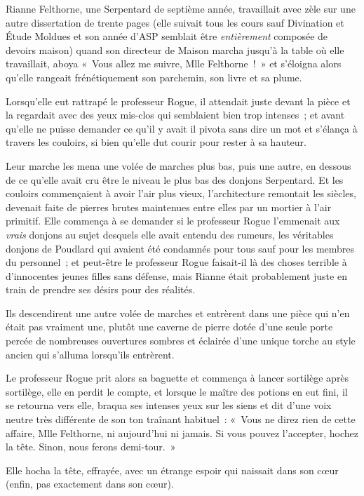 \later

Rianne Felthorne, une Serpentard de septième année, travaillait avec zèle sur une autre dissertation de trente pages (elle suivait tous les cours sauf Divination et Étude Moldues et son année d'ASP semblait être \emph{entièrement} composée de devoirs maison) quand son directeur de Maison marcha jusqu'à la table où elle travaillait, aboya «~Vous allez me suivre, Mlle Felthorne~!~» et s'éloigna alors qu'elle rangeait frénétiquement son parchemin, son livre et sa plume.

Lorsqu'elle eut rattrapé le professeur Rogue, il attendait juste devant la pièce et la regardait avec des yeux mis-clos qui semblaient bien trop intenses~; et avant qu'elle ne puisse demander ce qu'il y avait il pivota sans dire un mot et s'élança à travers les couloirs, si bien qu'elle dut courir pour rester à sa hauteur.

Leur marche les mena une volée de marches plus bas, puis une autre, en dessous de ce qu'elle avait cru être le niveau le plus bas des donjons Serpentard. Et les couloirs commençaient à avoir l'air plus vieux, l'architecture remontait les siècles, devenait faite de pierres brutes maintenues entre elles par un mortier à l'air primitif. Elle commença à se demander si le professeur Rogue l'emmenait aux \emph{vrais} donjons au sujet desquels elle avait entendu des rumeurs, les véritables donjons de Poudlard qui avaient été condamnés pour tous sauf pour les membres du personnel~; et peut-être le professeur Rogue faisait-il là des choses terrible à d'innocentes jeunes filles sans défense, mais Rianne était probablement juste en train de prendre ses désirs pour des réalités.

Ils descendirent une autre volée de marches et entrèrent dans une pièce qui n'en était pas vraiment une, plutôt une caverne de pierre dotée d'une seule porte percée de nombreuses ouvertures sombres et éclairée d'une unique torche au style ancien qui s'alluma lorsqu'ils entrèrent.

Le professeur Rogue prit alors sa baguette et commença à lancer sortilège après sortilège, elle en perdit le compte, et lorsque le maître des potions en eut fini, il se retourna vers elle, braqua ses intenses yeux sur les siens et dit d'une voix neutre très différente de son ton traînant habituel~: «~Vous ne direz rien de cette affaire, Mlle Felthorne, ni aujourd'hui ni jamais. Si vous pouvez l'accepter, hochez la tête. Sinon, nous ferons demi-tour.~»

Elle hocha la tête, effrayée, avec un étrange espoir qui naissait dans son cœur (enfin, pas exactement dans son cœur).

